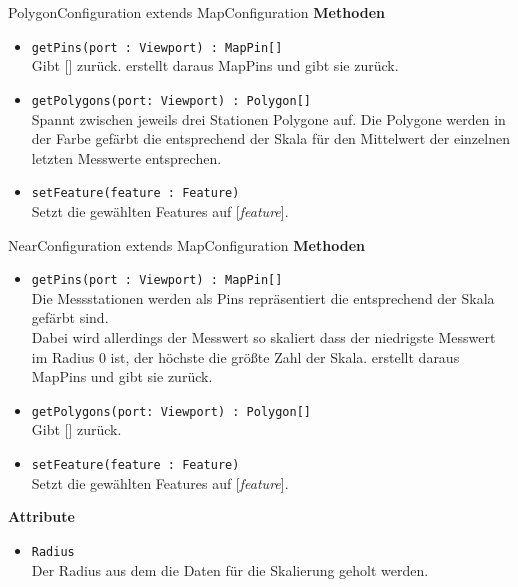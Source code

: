 \begin{Class}{PolygonConfiguration extends MapConfiguration}
    \textbf{Methoden}
    \begin{itemize}
        \item \texttt{getPins(port : Viewport) : MapPin[]}
        \\ Gibt [] zurück.
        erstellt daraus MapPins und gibt sie zurück.
        \item \texttt{getPolygons(port: Viewport) : Polygon[]}
        \\ Spannt zwischen jeweils drei Stationen Polygone auf.
        Die Polygone werden in der Farbe gefärbt die entsprechend der Skala für den Mittelwert der einzelnen letzten Messwerte entsprechen.
        \bigskip
        \item \texttt{setFeature(feature : Feature)}
        \\ Setzt die gewählten Features auf [\emph{feature}].
    \end{itemize}
\end{Class}

\begin{Class}{NearConfiguration extends MapConfiguration}
    \textbf{Methoden}
    \begin{itemize}
        \item \texttt{getPins(port : Viewport) : MapPin[]}
        \\ Die Messstationen werden als Pins repräsentiert die entsprechend der Skala gefärbt sind.
        \\ Dabei wird allerdings der Messwert so skaliert dass der niedrigste Messwert im Radius 0 ist, der höchste die größte Zahl der Skala.
        erstellt daraus MapPins und gibt sie zurück.
        \item \texttt{getPolygons(port: Viewport) : Polygon[]}
        \\ Gibt [] zurück.
        \bigskip
        \item \texttt{setFeature(feature : Feature)}
        \\ Setzt die gewählten Features auf [\emph{feature}].
    \end{itemize}
    \textbf{Attribute}
    \begin{itemize}
        \item \texttt{Radius}
        \\ Der Radius aus dem die Daten für die Skalierung geholt werden.
    \end{itemize}
\end{Class}

